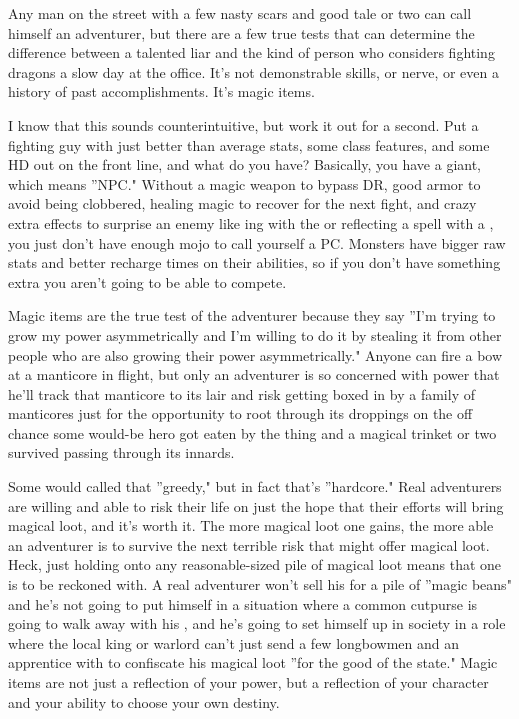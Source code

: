 Any man on the street with a few nasty scars and good tale or two can call himself an adventurer, but there are a few true tests that can determine the difference between a talented liar and the kind of person who considers fighting dragons a slow day at the office. It's not demonstrable skills, or nerve, or even a history of past accomplishments. It's magic items.

I know that this sounds counterintuitive, but work it out for a second. Put a fighting guy with just better than average stats, some class features, and some HD out on the front line, and what do you have? Basically, you have a giant, which means ''NPC." Without a magic weapon to bypass DR, good armor to avoid being clobbered, healing magic to recover for the next fight, and crazy extra effects to surprise an enemy like ing with the  or reflecting a spell with a , you just don't have enough mojo to call yourself a PC. Monsters have bigger raw stats and better recharge times on their abilities, so if you don't have something extra you aren't going to be able to compete.

Magic items are the true test of the adventurer because they say ''I'm trying to grow my power asymmetrically and I'm willing to do it by stealing it from other people who are also growing their power asymmetrically." Anyone can fire a bow at a manticore in flight, but only an adventurer is so concerned with power that he'll track that manticore to its lair and risk getting boxed in by a family of manticores just for the opportunity to root through its droppings on the off chance some would-be hero got eaten by the thing and a magical trinket or two survived passing through its innards.

Some would called that ''greedy," but in fact that's ''hardcore." Real adventurers are willing and able to risk their life on just the hope that their efforts will bring magical loot, and it's worth it. The more magical loot one gains, the more able an adventurer is to survive the next terrible risk that might offer magical loot. Heck, just holding onto any reasonable-sized pile of magical loot means that one is to be reckoned with. A real adventurer won't sell his  for a pile of ''magic beans" and he's not going to put himself in a situation where a common cutpurse is going to walk away with his , and he's going to set himself up in society in a role where the local king or warlord can't just send a few longbowmen and an apprentice with  to confiscate his magical loot ''for the good of the state." Magic items are not just a reflection of your power, but a reflection of your character and your ability to choose your own destiny.

